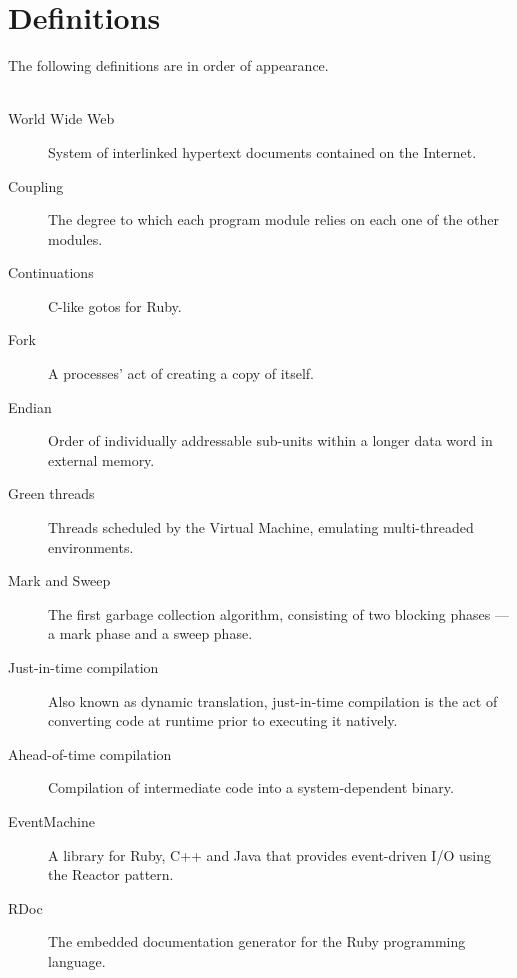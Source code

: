 \chapter*{Definitions} %
\label{cha:definitions}
The following definitions are in order of appearance.\\\\

\begin{description}
  \item[World Wide Web] System of interlinked hypertext documents contained on the Internet.
  \item[Coupling] The degree to which each program module relies on each one of the other modules.
  \item[Continuations] C-like gotos for Ruby.
  \item[Fork] A processes' act of creating a copy of itself.
  \item[Endian] Order of individually addressable sub-units within a longer data word in external memory.
  \item[Green threads] Threads scheduled by the Virtual Machine, emulating multi-threaded environments.
  \item[Mark and Sweep] The first garbage collection algorithm, consisting of two blocking phases --- a mark phase and a sweep phase.
  \item[Just-in-time compilation] Also known as dynamic translation, just-in-time compilation is the act of converting code at runtime prior to executing it natively.
  \item[Ahead-of-time compilation] Compilation of intermediate code into a system-dependent binary.
  \item[EventMachine] A library for Ruby, C++ and Java that provides event-driven I/O using the Reactor pattern.
  \item[RDoc] The embedded documentation generator for the Ruby programming language.
\end{description}

